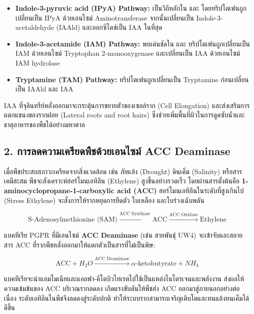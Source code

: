 \begin{itemize}
    \item \textbf{Indole-3-pyruvic acid (IPyA) Pathway:} เป็นวิถีหลักใน  และ  โดยทริปโตเฟนถูกเปลี่ยนเป็น IPyA ด้วยเอนไซม์ Aminotransferase จากนั้นเปลี่ยนเป็น Indole-3-acetaldehyde (IAAld) และออกซิไดซ์เป็น IAA ในที่สุด
    \item \textbf{Indole-3-acetamide (IAM) Pathway:} พบเด่นชัดใน  และ  ทริปโตเฟนถูกเปลี่ยนเป็น IAM ด้วยเอนไซม์ Tryptophan 2-monooxygenase และเปลี่ยนเป็น IAA ด้วยเอนไซม์ IAM hydrolase
    \item \textbf{Tryptamine (TAM) Pathway:} ทริปโตเฟนถูกเปลี่ยนเป็น Tryptamine ก่อนเปลี่ยนเป็น IAAld และ IAA
\end{itemize}

IAA ที่จุลินทรีย์หลั่งออกมาจะกระตุ้นการขยายตัวของเซลล์ราก (Cell Elongation) และส่งเสริมการแตกแขนงของรากฝอย (Lateral roots and root hairs) ซึ่งช่วยเพิ่มพื้นที่ผิวในการดูดซับน้ำและธาตุอาหารของพืชได้อย่างมหาศาล

\subsection{2. การลดความเครียดพืชด้วยเอนไซม์ ACC Deaminase}

เมื่อพืชประสบสภาวะเครียดจากสิ่งแวดล้อม เช่น ภัยแล้ง (Drought) ดินเค็ม (Salinity) หรือสารเคมีสะสม พืชจะสังเคราะห์ฮอร์โมนเอทิลีน (Ethylene) สูงขึ้นอย่างรวดเร็ว โดยผ่านสารตั้งต้นคือ \textbf{1-aminocyclopropane-1-carboxylic acid (ACC)} ฮอร์โมนเอทิลีนในระดับที่สูงเกินไป (Stress Ethylene) จะสั่งการให้รากหยุดการยืดตัว ใบเหลือง และใบร่วงเฉับพลัน

\begin{equation}
\text{S-Adenosylmethionine (SAM)} \xrightarrow{\text{ACC Synthase}} \text{ACC} \xrightarrow{\text{ACC Oxidase}} \text{Ethylene}
\end{equation}

แบคทีเรีย PGPR ที่มีเอนไซม์ \textbf{ACC Deaminase} (เช่น  สายพันธุ์ UW4) จะเข้าจับและสลายสาร ACC ที่รากพืชหลั่งออกมาให้แตกตัวเป็นสารที่ไม่เป็นพิษ:

\begin{equation}
\text{ACC} + H_2O \xrightarrow{\text{ACC Deaminase}} \alpha\text{-ketobutyrate} + NH_3
\end{equation}

แบคทีเรียจะนำแอมโมเนียและแอลฟา-คีโตบิวไทเรตไปใช้เป็นแหล่งไนโตรเจนและพลังงาน ส่งผลให้ความเข้มข้นของ ACC บริเวณรากลดลง เกิดแรงขับดันให้พืชส่ง ACC ออกมาสู่ภายนอกอย่างต่อเนื่อง ระดับเอทิลีนในพืชจึงลดลงสู่ระดับปกติ ทำให้ระบบรากสามารถเจริญเติบโตและทนแล้งทนเค็มได้ดีขึ้น

